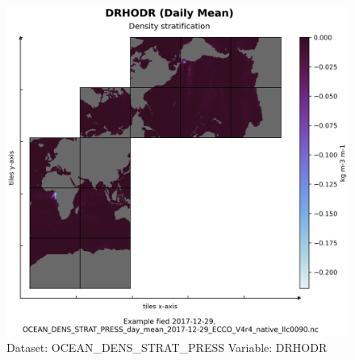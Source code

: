 \begin{figure}[H]
\centering
\includegraphics[width=\textwidth]{../images/plots/native_plots/Ocean_Density_Stratification_and_Hydrostatic_Pressure/DRHODR.png}
\caption{Dataset: OCEAN\_DENS\_STRAT\_PRESS Variable: DRHODR}
\label{tab:table-OCEAN_DENS_STRAT_PRESS_DRHODR-Plot}
\end{figure}
\pagebreak
